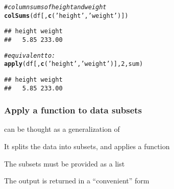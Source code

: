 \documentclass[12pt]{beamer}\usepackage[]{graphicx}\usepackage[]{color}
\makeatletter
\newcommand{\hlnum}[1]{\textcolor[rgb]{0.686,0.059,0.569}{#1}}%
\newcommand{\hlstr}[1]{\textcolor[rgb]{0.192,0.494,0.8}{#1}}%
\newcommand{\hlcom}[1]{\textcolor[rgb]{0.678,0.584,0.686}{\textit{#1}}}%
\newcommand{\hlstd}[1]{\textcolor[rgb]{0.345,0.345,0.345}{#1}}%
\newcommand{\hlkwd}[1]{\textcolor[rgb]{0.737,0.353,0.396}{\textbf{#1}}}%
\newenvironment{kframe}{%
 \def\at@end@of@kframe{}%
 \ifinner\ifhmode%
  \def\at@end@of@kframe{\end{minipage}}%
  \begin{minipage}{\columnwidth}%
 \fi\fi%
 \def\FrameCommand##1{\hskip\@totalleftmargin \hskip-\fboxsep
 \colorbox{shadecolor}{##1}\hskip-\fboxsep
     \hskip-\linewidth \hskip-\@totalleftmargin \hskip\columnwidth}%
 \MakeFramed {\advance\hsize-\width
   \@totalleftmargin\z@ \linewidth\hsize
   \@setminipage}}%
 {\par\unskip\endMakeFramed%
 \at@end@of@kframe}
\newenvironment{knitrout}{}{} %
\makeatother
\begin{document}

\begin{frame}[fragile]
\frametitle{}

\begin{knitrout}\footnotesize
{}\color{fgcolor}\begin{kframe}
\begin{alltt}
\hlcom{# column sums of height and weight}
\hlkwd{colSums}\hlstd{(df[ ,}\hlkwd{c}\hlstd{(}\hlstr{'height'}\hlstd{,} \hlstr{'weight'}\hlstd{)])}
\end{alltt}
\begin{verbatim}
## height weight 
##   5.85 233.00
\end{verbatim}
\begin{alltt}
\hlcom{# equivalent to:}
\hlkwd{apply}\hlstd{(df[ ,}\hlkwd{c}\hlstd{(}\hlstr{'height'}\hlstd{,} \hlstr{'weight'}\hlstd{)],} \hlnum{2}\hlstd{, sum)}
\end{alltt}
\begin{verbatim}
## height weight 
##   5.85 233.00
\end{verbatim}
\end{kframe}
\end{knitrout}

\end{frame}


\begin{frame}
\begin{center}
\Huge{}
\end{center}
\end{frame}


\begin{frame}
\frametitle{Apply a function to data subsets}

\bi
  \item {} can be thought as a generalization of 
  \item It splits the data into subsets, and applies a function
  \item The subsets must be provided as a list
  \item The output is returned in a ``convenient'' form
\ei

\end{frame}
\end{document}
